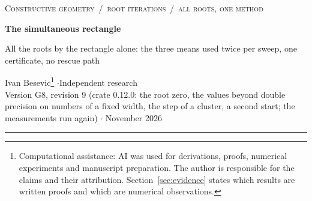 \documentclass[10pt,a4paper]{article}
\theoremstyle{definition}
\numberwithin{equation}{section}
\begin{document}
{\small\scshape Constructive geometry \,/\, root iterations \,/\, all roots, one method}

\vspace{6pt}
{\LARGE\bfseries The simultaneous rectangle\par}
\vspace{3pt}
{\large All the roots by the rectangle alone: the three means used twice per sweep, one certificate,
no rescue path\par}
\vspace{8pt}
Ivan Besevic\footnote{Computational assistance: AI was used for derivations, proofs, numerical
experiments and manuscript preparation. The author is responsible for the claims and their
attribution. Section~\ref{sec:evidence} states which results are written proofs and which are
numerical observations.}
\quad$\cdot$\quad Independent research\\
Version G8, revision 9 (crate 0.12.0: the root zero, the values beyond double precision on numbers of a
fixed width, the step of a cluster, a second start; the measurements run again) \quad$\cdot$ November 2026

\vspace{6pt}\hrule\vspace{8pt}
\end{document}
